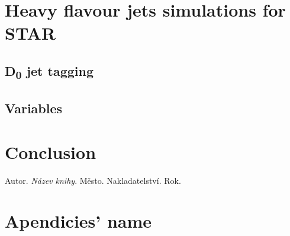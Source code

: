 \documentclass[a4paper,oneside,12pt]{book}
\newcommand{\ti}{\textit} %
\begin{document}
    \chapter{Heavy flavour jets simulations for STAR}
    \section{D\textsubscript{0} jet tagging}
    \section{Variables}









    \chapter*{Conclusion} %


    \clearpage
    \begin{thebibliography}{99}
         Autor. \ti{Název knihy}. Město. Nakladatelství. Rok.
    \end{thebibliography} %


    \newpage
    \appendix

    \chapter{Apendicies' name} %
\end{document}
